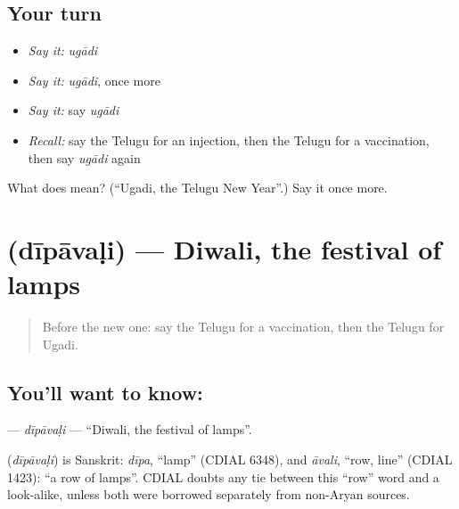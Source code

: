 \subsection*{Your turn}
\begin{itemize}
\raggedright
  \item \emph{Say it:} \emph{ugādi}
  \item \emph{Say it:} \emph{ugādi}, once more
  \item \emph{Say it:} say \emph{ugādi}
  \item \emph{Recall:} say the Telugu for an injection, then the Telugu for a vaccination, then say \emph{ugādi} again
\end{itemize}

\begin{tcolorbox}[breakable,colback=teal!4,colframe=teal!35!black,title={Before you move on}]
What does  mean? (\textquotedblleft{}Ugadi, the Telugu New Year\textquotedblright{}.) Say it once more.
\end{tcolorbox}
\section[\texorpdfstring{\te{దీపావళి} (dīpāvaḷi)}{దీపావళి (dīpāvaḷi)}]{ (dīpāvaḷi) — Diwali, the festival of lamps}

\label{lesson:TE-C252-dipavali}



\begin{quote}
Before the new one: say the Telugu for a vaccination, then the Telugu for Ugadi.
\end{quote}

\subsection*{You'll want to know: }
\textbf{} — \emph{dīpāvaḷi} — \textquotedblleft{}Diwali, the festival of lamps\textquotedblright{}.

\begin{cousinweb}
\textbf{} (\emph{dīpāvaḷi}) is Sanskrit: \emph{dīpa}, \textquotedblleft{}lamp\textquotedblright{} (CDIAL 6348), and \emph{āvali}, \textquotedblleft{}row, line\textquotedblright{} (CDIAL 1423): \textquotedblleft{}a row of lamps\textquotedblright{}. CDIAL doubts any tie between this \textquotedblleft{}row\textquotedblright{} word and a look-alike, unless both were borrowed separately from non-Aryan sources.
\end{cousinweb}

